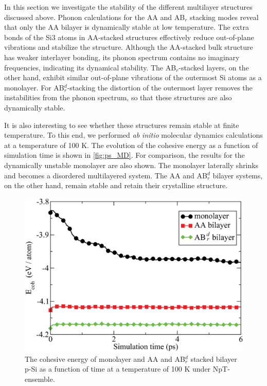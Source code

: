 In this section we investigate the stability of the different multilayer structures discussed above.
Phonon calculations for the AA and AB$_r$ stacking modes reveal that only the AA bilayer is dynamically stable at low temperature. The extra bonds of the Si3 atoms in AA-stacked structures effectively reduce out-of-plane vibrations and stabilize the structure. Although the AA-stacked bulk structure has weaker interlayer bonding, its phonon spectrum contains no imaginary frequencies, indicating its dynamical stability. The AB$_r$-stacked layers, on the other hand, exhibit similar out-of-plane vibrations of the outermost Si atoms as a monolayer. For AB$_r^d$-stacking the distortion of the outermost layer removes the instabilities from the phonon spectrum, so that these structures are also dynamically stable. 

It is also interesting to see whether these structures remain stable at finite temperature. To this end, we performed \textit{ab initio} molecular dynamics calculations at a temperature of 100 K. The evolution of the cohesive energy as a function of simulation time is shown in \autoref{fig:ps_MD}. For comparison, the results for the dynamically unstable monolayer are also shown. The monolayer laterally shrinks and becomes a disordered multilayered system. The AA and AB$_r^d$ bilayer systems, on the other hand, remain stable and retain their crystalline structure.

\begin{figure}[htbp]
\centering
\includegraphics[width=0.7\linewidth]{ps_ab_initio_MD_100K.eps}%
\caption{The cohesive energy of monolayer and AA and AB$_r^d$ stacked bilayer p-Si as a function of time at a temperature of 100 K under NpT-ensemble. \label{fig:ps_MD}}
\end{figure}


